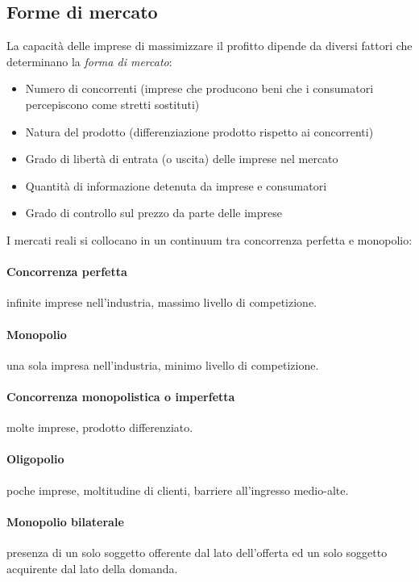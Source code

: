 \subsection{Forme di mercato}
La capacità delle imprese di massimizzare il profitto dipende da diversi fattori che determinano la \emph{forma di mercato}:
\begin{itemize}
	\item Numero di concorrenti (imprese che producono beni che i consumatori percepiscono come stretti
sostituti)
	\item Natura del prodotto (differenziazione prodotto rispetto ai concorrenti)
	\item Grado di libertà di entrata (o uscita) delle imprese nel mercato
	\item Quantità di informazione detenuta da imprese e consumatori
	\item Grado di controllo sul prezzo da parte delle imprese
\end{itemize}

I mercati reali si collocano in un continuum tra concorrenza perfetta e monopolio:
\paragraph{Concorrenza perfetta} infinite imprese nell’industria, massimo livello di competizione.
\paragraph{Monopolio} una sola impresa nell’industria, minimo livello di competizione.
\paragraph{Concorrenza monopolistica o imperfetta} molte imprese, prodotto differenziato.
\paragraph{Oligopolio} poche imprese, moltitudine di clienti, barriere all’ingresso medio-alte.
\paragraph{Monopolio bilaterale} presenza di un solo soggetto offerente dal lato dell'offerta ed un solo soggetto
acquirente dal lato della domanda.

